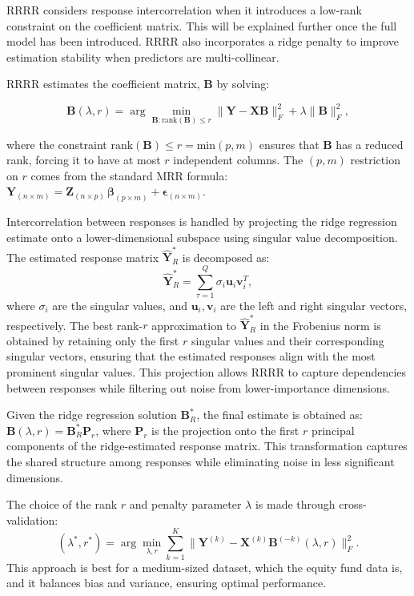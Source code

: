 RRRR considers response intercorrelation when it introduces a low-rank constraint on the coefficient matrix. This will be explained further once the full model has been introduced. RRRR also incorporates a ridge penalty to improve estimation stability when predictors are multi-collinear.\cite{mukherjee2011reduced}

\noindent RRRR estimates the coefficient matrix, \( \mathbf{B} \) by solving:

\[
\mathbf{B}(\lambda, r) = \arg \min_{\mathbf{B}: \text{rank}(\mathbf{B}) \leq r} \|\mathbf{Y} - \mathbf{X} \mathbf{B}\|_F^2 + \lambda \|\mathbf{B}\|_F^2,
\]

\noindent where the constraint \(\text{rank}(\mathbf{B}) \leq r = \text{min}(p,m)\) ensures that \(\mathbf{B}\) has a reduced rank, forcing it to have at most \(r\) independent columns. The $(p,m)$ restriction on $r$ comes from the standard MRR formula:
$\boldsymbol{Y}_{(n \times m)} = \boldsymbol{Z}_{(n \times p)} \, \boldsymbol{\beta}_{(p \times m)} + \boldsymbol{\epsilon}_{(n \times m)}$.

\noindent Intercorrelation between responses is handled by projecting the ridge regression estimate onto a lower-dimensional subspace using singular value decomposition. The estimated response matrix \( \hat{\mathbf{Y}}^*_R \) is decomposed as:
\[
\hat{\mathbf{Y}}^*_R = \sum_{\tau=1}^{Q} \sigma_i \mathbf{u}_i \mathbf{v}_i^T,
\]
\noindent where \( \sigma_i \) are the singular values, and \( \mathbf{u}_i, \mathbf{v}_i \) are the left and right singular vectors, respectively. \cite{mukherjee2011reduced} The best rank-\( r \) approximation to \( \hat{\mathbf{Y}}^*_R \) in the Frobenius norm is obtained by retaining only the first \( r \) singular values and their corresponding singular vectors, ensuring that the estimated responses align with the most prominent singular values. \cite{mukherjee2011reduced} This projection allows RRRR to capture dependencies between responses while filtering out noise from lower-importance dimensions. \cite{mukherjee2011reduced} 

Given the ridge regression solution \( \mathbf{B}_R^* \), the final estimate is obtained as: $\mathbf{B}(\lambda, r) = \mathbf{B}_R^* \mathbf{P}_r$, where \( \mathbf{P}_r \) is the projection onto the first \( r \) principal components of the ridge-estimated response matrix. This transformation captures the shared structure among responses while eliminating noise in less significant dimensions.\cite{mukherjee2011reduced}

\noindent The choice of the rank \( r \) and penalty parameter \( \lambda \) is made through cross-validation:
\[
(\lambda^*, r^*) = \arg \min_{\lambda, r} \sum_{k=1}^{K} \| \mathbf{Y}^{(k)} - \mathbf{X}^{(k)} \mathbf{B}^{(-k)}(\lambda, r) \|_F^2.
\]
This approach is best for a medium-sized dataset, which the equity fund data is, and it balances bias and variance, ensuring optimal performance.

